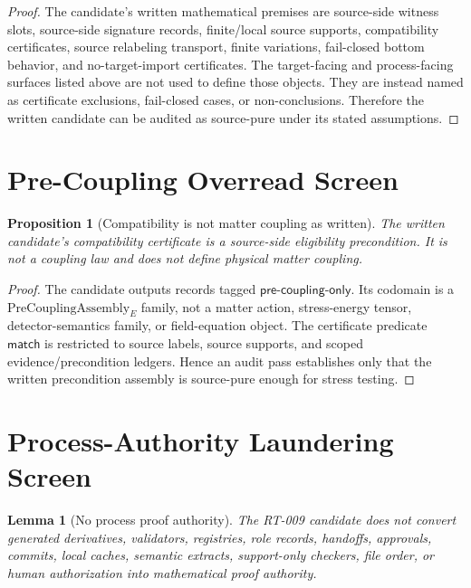 \documentclass[11pt]{article}
\newcommand{\PreCoupAsm}{\mathrm{PreCouplingAssembly}}
\newtheorem{lemma}{Lemma}
\newtheorem{proposition}{Proposition}
\begin{document}
\begin{proof}
The candidate's written mathematical premises are source-side witness slots,
source-side signature records, finite/local source supports, compatibility
certificates, source relabeling transport, finite variations, fail-closed
bottom behavior, and no-target-import certificates. The target-facing and
process-facing surfaces listed above are not used to define those objects.
They are instead named as certificate exclusions, fail-closed cases, or
non-conclusions. Therefore the written candidate can be audited as
source-pure under its stated assumptions.
\end{proof}

\section{Pre-Coupling Overread Screen}

\begin{proposition}[Compatibility is not matter coupling as written]
The written candidate's compatibility certificate is a source-side eligibility
precondition. It is not a coupling law and does not define physical matter
coupling.
\end{proposition}

\begin{proof}
The candidate outputs records tagged
\(\mathsf{pre\text{-}coupling\text{-}only}\). Its codomain is a
\(\PreCoupAsm_E\) family, not a matter action, stress-energy tensor,
detector-semantics family, or field-equation object. The certificate predicate
\(\mathsf{match}\) is restricted to source labels, source supports, and scoped
evidence/precondition ledgers. Hence an audit pass establishes only that the
written precondition assembly is source-pure enough for stress testing.
\end{proof}

\section{Process-Authority Laundering Screen}

\begin{lemma}[No process proof authority]
The RT-009 candidate does not convert generated derivatives, validators,
registries, role records, handoffs, approvals, commits, local caches,
semantic extracts, support-only checkers, file order, or human authorization
into mathematical proof authority.
\end{lemma}
\end{document}
